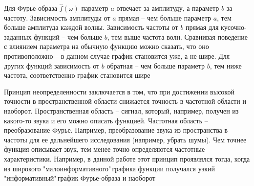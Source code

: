 \documentclass[a4paper, 16pt]{article}
\begin{document}
    \noindent Для Фурье-образа $\hat{f}(\omega)$ параметр $a$ отвечает за амплитуду, а параметр $b$
    за частоту. Зависимость амплитуды от $a$ прямая -- чем больше параметр $a$, тем больше амплитуда
    каждой волны. Зависимость частоты от $b$ прямая для кусочно-заданных функций -- чем больше $b$,
    тем выше частота волн. Сравнивая поведение с влиянием параметра на обычную функцию можно сказать,
    что оно противоположно -- в данном случае график становится уже, а не шире. Для других функций
    зависимость от $b$ обратная -- чем больше параметр $b$, тем ниже частота, соответственно график становится
    шире


    \noindent Принцип неопределенности заключается в том, что при достижении высокой точности в пространственной области
    снижается точность в частотной области и наоборот. Пространственная область -- сигнал, который, например, получен из
    какого-то звука и его можно описать функцией. Частотная область -- преобразование Фурье. Например, преобразование
    звука из пространства в частоты для ее дальнейшего исследования (например, убрать шумы). Чем точнее функция описывает
    звук, тем менее точно определяются частотные характеристики. Например, в данной работе этот принцип проявлялся тогда,
    когда из широкого "малоинформативного"\,графика функции получался узкий "информативный"\,график Фурье-образа и наоборот
\end{document}
